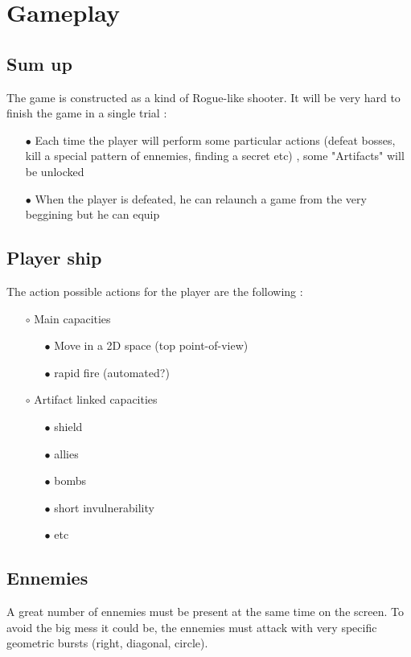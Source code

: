 \documentclass[12pt,a4paper]{article}
\begin{document}
\section{Gameplay}
    \subsection{Sum up}
        The game is constructed as a kind of Rogue-like shooter. It will be very hard to finish the game in a single trial :
            \begin{itemize}
                \item[$\bullet$] Each time the player will perform some particular actions (defeat bosses, kill a special pattern of ennemies, finding a secret etc) , some "Artifacts" will be unlocked
                \item[$\bullet$] When the player is defeated, he can relaunch a game from the very beggining but he can equip

            \end{itemize}
        
    \subsection{Player ship}
        The action possible actions for the player are the following :
            \begin{itemize}
                \item[$\circ$] Main capacities
                \begin{itemize}
                    \item[$\bullet$] Move in a 2D space (top point-of-view)
                    \item[$\bullet$] rapid fire (automated?)
                \end{itemize}
                \item[$\circ$] Artifact linked capacities
                \begin{itemize}
                    \item[$\bullet$] shield
                    \item[$\bullet$] allies
                    \item[$\bullet$] bombs
                    \item[$\bullet$] short invulnerability
                    \item[$\bullet$] etc

                \end{itemize}
            \end{itemize}
    \subsection{Ennemies}
        A great number of ennemies must be present at the same time on the screen. To avoid the big mess it could be, the ennemies must attack with very specific geometric bursts (right, diagonal, circle).
\end{document}
